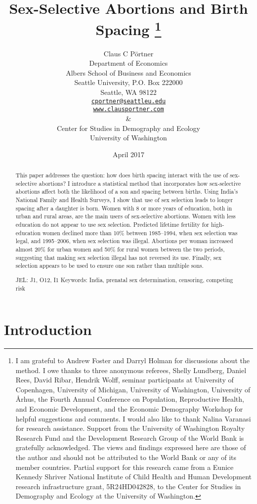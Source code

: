 \documentclass[12pt,letterpaper]{article}
\title{Sex-Selective Abortions and Birth Spacing
\protect\thanks{%
I am grateful to Andrew Foster and Darryl Holman for discussions about the method.
I owe thanks to three anonymous referees, Shelly Lundberg, Daniel Rees, David Ribar, 
Hendrik Wolff, seminar participants at University of Copenhagen, University of Michigan, 
University of Washington, University of \AA{}rhus, the Fourth 
Annual Conference on Population, Reproductive Health, 
and Economic Development, and the Economic Demography Workshop for helpful suggestions and comments.
I would also like to thank Nalina Varanasi for research assistance.
Support from the University of Washington Royalty Research Fund and the 
Development Research Group of the World Bank is gratefully acknowledged.
The views and findings expressed here are those of the author and
should not be attributed to the World Bank or any of its member countries.
Partial support for this research came from a Eunice Kennedy Shriver National
Institute of Child Health and Human Development research infrastructure grant,
5R24HD042828, to the Center for Studies in Demography and Ecology at the
University of Washington.
}
}
\author{}
\author{Claus C P\"ortner\\
    Department of Economics\\
    Albers School of Business and Economics\\
    Seattle University, P.O. Box 222000\\
    Seattle, WA 98122\\
    \href{mailto:cportner@seattleu.edu}{\texttt{cportner@seattleu.edu}}\\
    \href{http://www.clausportner.com}{\texttt{www.clausportner.com}}\\
    \& \\
    Center for Studies in Demography and Ecology \\
    University of Washington\\ \vspace{2cm}
    }
\date{April 2017}
\begin{document}
\graphicspath{{figures/}}

\setcounter{page}{-1}
\maketitle
\thispagestyle{empty}

\newpage

\doublespacing


 
\maketitle
\thispagestyle{empty}


\newpage
\doublespacing


\begin{abstract}

\noindent This paper addresses the question:
how does birth spacing interact with the use of sex-selective abortions? 
I introduce a statistical method that incorporates how sex-selective abortions 
affect both the likelihood of a son and spacing between births.
Using India's National Family and Health Surveys,
I show that use of sex selection leads to longer spacing after a daughter is born.
Women with 8 or more years of education, both in urban and rural areas, are the main users 
of sex-selective abortions.
Women with less education do not appear to use sex selection.
Predicted lifetime fertility for high-education women declined more than 10\% 
between 1985--1994, when sex selection was legal, and 1995--2006, when sex selection was illegal.
Abortions per woman increased almost 20\% for urban women and 50\%
for rural women between the two periods, suggesting that making sex selection illegal has 
not reversed its use.
Finally, sex selection appears to be used to ensure one son rather than multiple sons.

\noindent JEL: J1, O12, I1
\noindent Keywords: India, prenatal sex determination, censoring, competing risk
\end{abstract}

\newpage



\section{Introduction\label{sec:intro}}
\end{document}
